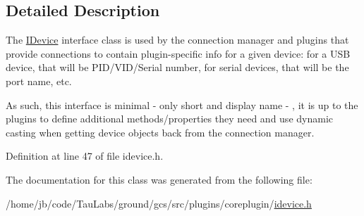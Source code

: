 \subsection{\-Detailed \-Description}
\-The \hyperlink{class_core_1_1_i_device}{\-I\-Device} interface class is used by the connection manager and plugins that provide connections to contain plugin-\/specific info for a given device\-: for a \-U\-S\-B device, that will be \-P\-I\-D/\-V\-I\-D/\-Serial number, for serial devices, that will be the port name, etc.

\-As such, this interface is minimal -\/ only short and display name -\/ , it is up to the plugins to define additional methods/properties they need and use dynamic casting when getting device objects back from the connection manager. 

\-Definition at line 47 of file idevice.\-h.



\-The documentation for this class was generated from the following file\-:\begin{DoxyCompactItemize}
\item 
/home/jb/code/\-Tau\-Labs/ground/gcs/src/plugins/coreplugin/\hyperlink{idevice_8h}{idevice.\-h}\end{DoxyCompactItemize}
